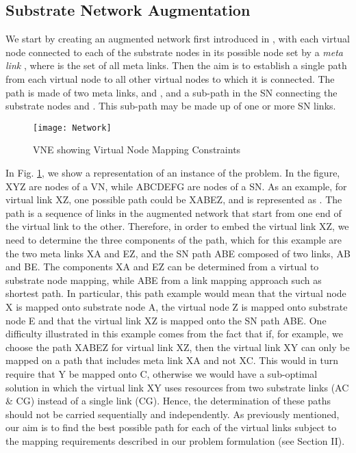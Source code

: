 \documentclass[journal]{IEEEtran}
\begin{document}
\subsection{Substrate Network Augmentation}
We start by creating an augmented network first introduced in \cite{Chowdhury12},  with each virtual node  connected to each of the substrate nodes in its possible node set  by a \emph{meta link} \cite{Chowdhury12} , where  is the set of all meta links. Then the aim is to establish a single path  from each virtual node  to all other virtual nodes  to which it is connected. The path  is made of two meta links,  and , and a sub-path in the \ac{SN} connecting the substrate nodes  and . This sub-path may be made up of one or more \ac{SN} links.
\begin{figure}
\centering
  {\texttt{[image: Network]}}
  \caption{VNE showing Virtual Node Mapping Constraints}
  \label{Diagram}
\end{figure}
In Fig. \ref{Diagram}, we show a representation of an instance of the problem. In the figure, XYZ are nodes of a \ac{VN}, while ABCDEFG are nodes of a \ac{SN}. As an example, for virtual link XZ, one possible path could be XABEZ, and is represented as . The path  is a sequence of links in the augmented network that start from one end of the virtual link to the other. Therefore, in order to embed the virtual link XZ, we need to determine the three components of the path, which  for this example  are the two meta links XA and EZ, and the \ac{SN} path ABE composed of two links, AB and BE. The components XA and EZ can be determined from a virtual to substrate node mapping, while ABE from a link mapping approach such as shortest path. In particular, this path example would mean that the virtual node X is mapped onto substrate node A, the virtual node Z is mapped onto substrate node E and that the virtual link XZ is mapped onto the \ac{SN} path ABE. One difficulty illustrated in this example comes from the fact that if, for example, we choose the path XABEZ for virtual link XZ, then the virtual link XY can only be mapped on a path that includes meta link XA and not XC. This would in turn require that Y be mapped onto C, otherwise we would have a sub-optimal solution in which the virtual link XY uses resources from two substrate links (AC \& CG) instead of a single link (CG). Hence, the determination of these paths should not be carried sequentially and independently. As previously mentioned, our aim is to find the best possible path for each of the virtual links subject to the mapping requirements described in our problem formulation (see Section II).
\end{document}
